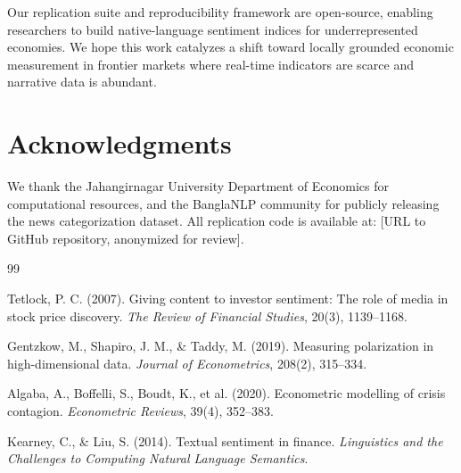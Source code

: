 \documentclass[11pt]{article}
\begin{document}
Our replication suite and reproducibility framework are open-source, enabling researchers to build native-language sentiment indices for underrepresented economies. We hope this work catalyzes a shift toward locally grounded economic measurement in frontier markets where real-time indicators are scarce and narrative data is abundant.

\section*{Acknowledgments}

We thank the Jahangirnagar University Department of Economics for computational resources, and the BanglaNLP community for publicly releasing the news categorization dataset. All replication code is available at: [URL to GitHub repository, anonymized for review].

\begin{thebibliography}{99}

 Tetlock, P. C. (2007). Giving content to investor sentiment: The role of media in stock price discovery. \textit{The Review of Financial Studies}, 20(3), 1139--1168.

 Gentzkow, M., Shapiro, J. M., \& Taddy, M. (2019). Measuring polarization in high-dimensional data. \textit{Journal of Econometrics}, 208(2), 315--334.

 Algaba, A., Boffelli, S., Boudt, K., et al. (2020). Econometric modelling of crisis contagion. \textit{Econometric Reviews}, 39(4), 352--383.

 Kearney, C., \& Liu, S. (2014). Textual sentiment in finance. \textit{Linguistics and the Challenges to Computing Natural Language Semantics}.

\end{thebibliography}
\end{document}
